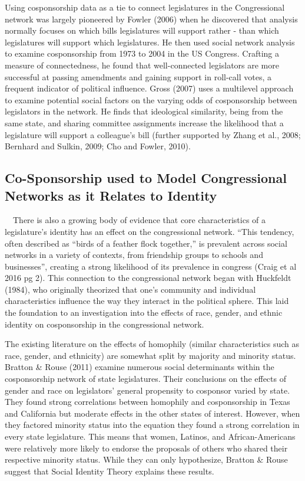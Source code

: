 \documentclass[Royal,times,sageh]{sagej}
\begin{document}
Using cosponsorship data as a tie to connect legislatures in the
Congressional network was largely pioneered by Fowler (2006) when he
discovered that analysis normally focuses on which bills legislatures
will support rather - than which legislatures will support which
legislatures. He then used social network analysis to examine
cosponsorship from 1973 to 2004 in the US Congress. Crafting a measure
of connectedness, he found that well-connected legislators are more
successful at passing amendments and gaining support in roll-call votes,
a frequent indicator of political influence. Gross (2007) uses a
multilevel approach to examine potential social factors on the varying
odds of cosponsorship between legislators in the network. He finds that
ideological similarity, being from the same state, and sharing committee
assignments increase the likelihood that a legislature will support a
colleague's bill (further supported by Zhang et al., 2008; Bernhard and
Sulkin, 2009; Cho and Fowler, 2010).

\hypertarget{co-sponsorship-used-to-model-congressional-networks-as-it-relates-to-identity}{%
\subsection{Co-Sponsorship used to Model Congressional Networks as it
Relates to
Identity}\label{co-sponsorship-used-to-model-congressional-networks-as-it-relates-to-identity}}

~~There is also a growing body of evidence that core characteristics of
a legislature's identity has an effect on the congressional network.
``This tendency, often described as ``birds of a feather flock
together,'' is prevalent across social networks in a variety of
contexts, from friendship groups to schools and businesses'', creating a
strong likelihood of its prevalence in congress (Craig et al 2016 pg 2).
This connection to the congressional network began with Huckfeldt
(1984), who originally theorized that one's community and individual
characteristics influence the way they interact in the political sphere.
This laid the foundation to an investigation into the effects of race,
gender, and ethnic identity on cosponsorship in the congressional
network.

The existing literature on the effects of homophily (similar
characteristics such as race, gender, and ethnicity) are somewhat split
by majority and minority status. Bratton \& Rouse (2011) examine
numerous social determinants within the cosponsorship network of state
legislatures. Their conclusions on the effects of gender and race on
legislators' general propensity to cosponsor varied by state. They found
strong correlations between homophily and cosponsorship in Texas and
California but moderate effects in the other states of interest.
However, when they factored minority status into the equation they found
a strong correlation in every state legislature. This means that women,
Latinos, and African-Americans were relatively more likely to endorse
the proposals of others who shared their respective minority status.
While they can only hypothesize, Bratton \& Rouse suggest that Social
Identity Theory explains these results.
\end{document}
